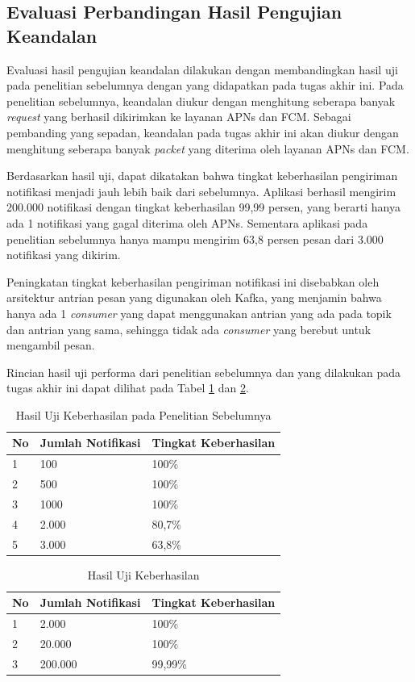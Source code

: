 \subsection{Evaluasi Perbandingan Hasil Pengujian Keandalan}
\par Evaluasi hasil pengujian keandalan dilakukan dengan membandingkan hasil uji pada penelitian sebelumnya dengan yang didapatkan pada tugas akhir ini. Pada penelitian sebelumnya, keandalan diukur dengan menghitung seberapa banyak \textit{request} yang berhasil dikirimkan ke layanan APNs dan FCM. Sebagai pembanding yang sepadan, keandalan pada tugas akhir ini akan diukur dengan menghitung seberapa banyak \textit{packet} yang diterima oleh layanan APNs dan FCM.
\par Berdasarkan hasil uji, dapat dikatakan bahwa tingkat keberhasilan pengiriman notifikasi menjadi jauh lebih baik dari sebelumnya. Aplikasi berhasil mengirim 200.000 notifikasi dengan tingkat keberhasilan 99,99 persen, yang berarti hanya ada 1 notifikasi yang gagal diterima oleh APNs. Sementara aplikasi pada penelitian sebelumnya hanya mampu mengirim 63,8 persen pesan dari 3.000 notifikasi yang dikirim.
\par Peningkatan tingkat keberhasilan pengiriman notifikasi ini disebabkan oleh arsitektur antrian pesan yang digunakan oleh Kafka, yang menjamin bahwa hanya ada 1 \textit{consumer} yang dapat menggunakan antrian yang ada pada topik dan antrian yang sama, sehingga tidak ada \textit{consumer} yang berebut untuk mengambil pesan.
\par Rincian hasil uji performa dari penelitian sebelumnya dan yang dilakukan pada tugas akhir ini dapat dilihat pada Tabel \ref{t:keandalan-lama} dan \ref{t:keandalan-baru}.
\begin{longtable}{|p{0.5cm}|p{3cm}|p{4cm}|}
	\caption{Hasil Uji Keberhasilan pada Penelitian Sebelumnya} \label{t:keandalan-lama} \\ \hline
	\rowcolor{lightgray} No & Jumlah Notifikasi & Tingkat Keberhasilan \\ \hline
	1 & 100 & 100\% \\ \hline
	2 & 500 & 100\% \\ \hline
	3 & 1000 & 100\% \\ \hline
	4 & 2.000 & 80,7\% \\ \hline
	5 & 3.000 & 63,8\% \\ \hline
\end{longtable}
\begin{longtable}{|p{0.5cm}|p{3cm}|p{4cm}|}
	\caption{Hasil Uji Keberhasilan} \label{t:keandalan-baru} \\ \hline
	\rowcolor{lightgray} No & Jumlah Notifikasi & Tingkat Keberhasilan \\ \hline
	1 & 2.000 & 100\% \\ \hline
	2 & 20.000 & 100\% \\ \hline
	3 & 200.000 & 99,99\% \\ \hline
\end{longtable}

